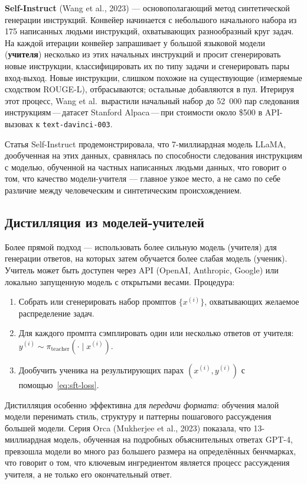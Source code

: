\textbf{Self-Instruct} (Wang et al., 2023) --- основополагающий метод синтетической генерации инструкций. Конвейер начинается с небольшого начального набора из 175 написанных людьми инструкций, охватывающих разнообразный круг задач. На каждой итерации конвейер запрашивает у большой языковой модели (\textbf{учителя}) несколько из этих начальных инструкций и просит сгенерировать новые инструкции, классифицировать их по типу задачи и сгенерировать пары вход-выход. Новые инструкции, слишком похожие на существующие (измеряемые сходством ROUGE-L), отбрасываются; остальные добавляются в пул. Итерируя этот процесс, Wang et al.\ вырастили начальный набор до 52~000 пар следования инструкциям\,---\,датасет Stanford Alpaca\,---\,при стоимости около \$500 в API-вызовах к \texttt{text-davinci-003}.

Статья Self-Instruct продемонстрировала, что 7-миллиардная модель LLaMA, дообученная на этих данных, сравнялась по способности следования инструкциям с моделью, обученной на частных написанных людьми данных, что говорит о том, что качество модели-учителя --- главное узкое место, а не само по себе различие между человеческим и синтетическим происхождением.

\subsection{Дистилляция из моделей-учителей}

Более прямой подход --- использовать более сильную модель (учителя) для генерации ответов, на которых затем обучается более слабая модель (ученик). Учитель может быть доступен через API (OpenAI, Anthropic, Google) или локально запущенную модель с открытыми весами. Процедура:

\begin{enumerate}[leftmargin=*]
  \item Собрать или сгенерировать набор промптов $\{x^{(i)}\}$, охватывающих желаемое распределение задач.
  \item Для каждого промпта сэмплировать один или несколько ответов от учителя: $y^{(i)} \sim \pi_{\mathrm{teacher}}(\cdot \mid x^{(i)})$.
  \item Дообучить ученика на результирующих парах $(x^{(i)}, y^{(i)})$ с помощью~\eqref{eq:sft-loss}.
\end{enumerate}

Дистилляция особенно эффективна для \emph{передачи формата}: обучения малой модели перенимать стиль, структуру и паттерны пошагового рассуждения большей модели. Серия Orca (Mukherjee et al., 2023) показала, что 13-миллиардная модель, обученная на подробных объяснительных ответах GPT-4, превзошла модели во много раз большего размера на определённых бенчмарках, что говорит о том, что ключевым ингредиентом является процесс рассуждения учителя, а не только его окончательный ответ.

